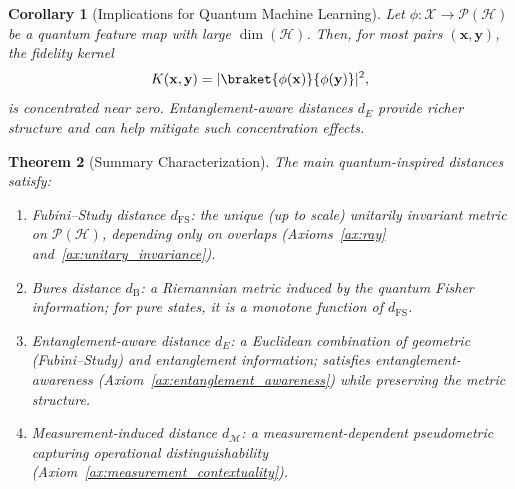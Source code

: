 \documentclass[aps,pra,reprint,nofootinbib,showpacs,superscriptaddress]{revtex4-1}
\newtheorem{theorem}{Theorem}[section]
\newtheorem{corollary}[theorem]{Corollary}
\newcommand{\Hilbert}{\mathcal{H}}
\newcommand{\Proj}{\mathcal{P}}
\begin{document}
\begin{corollary}[Implications for Quantum Machine Learning]
Let $\phi: \mathcal{X} \to \Proj(\Hilbert)$ be a quantum feature map with large $\dim(\Hilbert)$. Then, for most pairs $(\mathbf{x},\mathbf{y})$, the fidelity kernel
\[
K(\mathbf{x},\mathbf{y}) = |\braket{\phi(\mathbf{x})}{\phi(\mathbf{y})}|^2,
\]
is concentrated near zero. Entanglement-aware distances $d_E$ provide richer structure and can help mitigate such concentration effects.
\end{corollary}




\begin{theorem}[Summary Characterization]
\label{thm:summary}
The main quantum-inspired distances satisfy:
\begin{enumerate}[label=(\roman*)]
    \item {Fubini--Study distance $d_{\text{FS}}$:} the unique (up to scale) unitarily invariant metric on $\Proj(\Hilbert)$, depending only on overlaps (Axioms~\ref{ax:ray} and~\ref{ax:unitary_invariance}).
    \item {Bures distance $d_{\text{B}}$:} a Riemannian metric induced by the quantum Fisher information; for pure states, it is a monotone function of $d_{\text{FS}}$.
    \item {Entanglement-aware distance $d_E$:} a Euclidean combination of geometric (Fubini--Study) and entanglement information; satisfies entanglement-awareness (Axiom~\ref{ax:entanglement_awareness}) while preserving the metric structure.
    \item {Measurement-induced distance $d_{\mathcal{M}}$:} a measurement-dependent pseudometric capturing operational distinguishability (Axiom~\ref{ax:measurement_contextuality}).
\end{enumerate}
\end{theorem}
\end{document}

